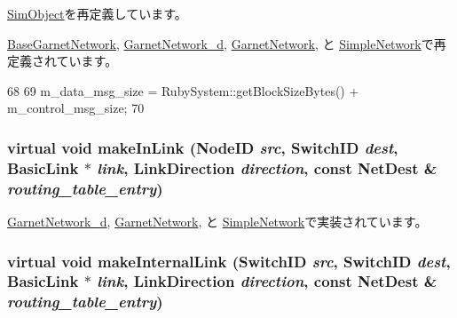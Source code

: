 \hyperlink{classSimObject_a02fd73d861ef2e4aabb38c0c9ff82947}{SimObject}を再定義しています。

\hyperlink{classBaseGarnetNetwork_a02fd73d861ef2e4aabb38c0c9ff82947}{BaseGarnetNetwork}, \hyperlink{classGarnetNetwork__d_a02fd73d861ef2e4aabb38c0c9ff82947}{GarnetNetwork\_\-d}, \hyperlink{classGarnetNetwork_a02fd73d861ef2e4aabb38c0c9ff82947}{GarnetNetwork}, と \hyperlink{classSimpleNetwork_a02fd73d861ef2e4aabb38c0c9ff82947}{SimpleNetwork}で再定義されています。


\begin{DoxyCode}
68 {
69     m_data_msg_size = RubySystem::getBlockSizeBytes() + m_control_msg_size;
70 }
\end{DoxyCode}
\hypertarget{classNetwork_a989337badc16737935316d1faa84a017}{
\subsubsection[{makeInLink}]{\setlength{\rightskip}{0pt plus 5cm}virtual void makeInLink ({\bf NodeID} {\em src}, \/  {\bf SwitchID} {\em dest}, \/  {\bf BasicLink} $\ast$ {\em link}, \/  LinkDirection {\em direction}, \/  const {\bf NetDest} \& {\em routing\_\-table\_\-entry})}}
\label{classNetwork_a989337badc16737935316d1faa84a017}


\hyperlink{classGarnetNetwork__d_ac4cf8ff50e877f26606c24880c73fb9d}{GarnetNetwork\_\-d}, \hyperlink{classGarnetNetwork_ac4cf8ff50e877f26606c24880c73fb9d}{GarnetNetwork}, と \hyperlink{classSimpleNetwork_ac4cf8ff50e877f26606c24880c73fb9d}{SimpleNetwork}で実装されています。\hypertarget{classNetwork_adc0a708d423af0acbe045a50a46d7b03}{
\subsubsection[{makeInternalLink}]{\setlength{\rightskip}{0pt plus 5cm}virtual void makeInternalLink ({\bf SwitchID} {\em src}, \/  {\bf SwitchID} {\em dest}, \/  {\bf BasicLink} $\ast$ {\em link}, \/  LinkDirection {\em direction}, \/  const {\bf NetDest} \& {\em routing\_\-table\_\-entry})}}
\label{classNetwork_adc0a708d423af0acbe045a50a46d7b03}


